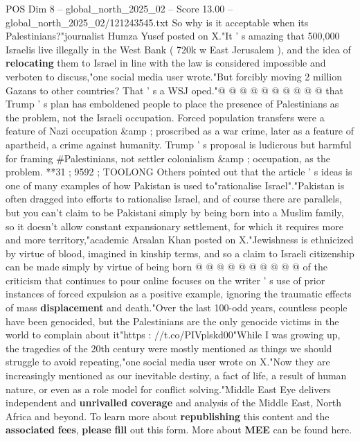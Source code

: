 \begin{textsample}{POS Dim 8 – global\_north\_2025\_02 – Score 13.00 – global\_north\_2025\_02/121243545.txt}
So why is it acceptable when its Palestinians?"journalist Humza Yusef posted on X."It ' s amazing that 500,000 Israelis live illegally in the West Bank ( 720k w East Jerusalem ), and the idea of \textbf{relocating} them to Israel in line with the law is considered impossible and verboten to discuss,"one social media user wrote."But forcibly moving 2 million Gazans to other countries?
That ' s a WSJ oped."@ @ @ @ @ @ @ @ @ @ that Trump ' s plan has emboldened people to place the presence of Palestinians as the problem, not the Israeli occupation.
Forced population transfers were a feature of Nazi occupation \&amp ; proscribed as a war crime, later as a feature of apartheid, a crime against humanity.
Trump ' s proposal is ludicrous but harmful for framing \#Palestinians, not settler colonialism \&amp ; occupation, as the problem. **31 ; 9592 ; TOOLONG Others pointed out that the article ' s ideas is one of many examples of how Pakistan is used to"rationalise Israel"."Pakistan is often dragged into efforts to rationalise Israel, and of course there are parallels, but you can't claim to be Pakistani simply by being born into a Muslim family, so it doesn't allow constant expansionary settlement, for which it requires more and more territory,"academic Arsalan Khan posted on X."Jewishness is ethnicized by virtue of blood, imagined in kinship terms, and so a claim to Israeli citizenship can be made simply by virtue of being born @ @ @ @ @ @ @ @ @ @ of the criticism that continues to pour online focuses on the writer ' s use of prior instances of forced expulsion as a positive example, ignoring the traumatic effects of mass \textbf{displacement} and death."Over the last 100-odd years, countless people have been genocided, but the Palestinians are the only genocide victims in the world to complain about it"https : //t.co/PIVplskd00"While I was growing up, the tragedies of the 20th century were mostly mentioned as things we should struggle to avoid repeating,"one social media user wrote on X."Now they are increasingly mentioned as our inevitable destiny, a fact of life, a result of human nature, or even as a role model for conflict solving."Middle East Eye delivers independent and \textbf{unrivalled} \textbf{coverage} and analysis of the Middle East, North Africa and beyond.
To learn more about \textbf{republishing} this content and the \textbf{associated} \textbf{fees}, \textbf{please} \textbf{fill} out this form.
More about \textbf{MEE} can be found here.

\end{textsample}
